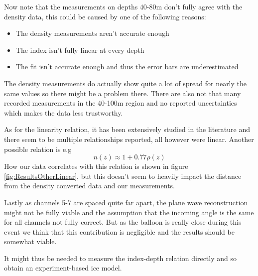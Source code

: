 Now note that the measurements on depths 40-80m don't fully agree with the density data, 
this could be caused by one of the following reasons:
\begin{itemize}
	\item The density measurements aren't accurate enough
	\item The index isn't fully linear at every depth
	\item The fit isn't accurate enough and thus the error bars are underestimated
\end{itemize}
The density measurements do actually show quite a lot of spread for
nearly the same values so there might be a problem there. There are
also not that many recorded measurements in the 40-100m region and no reported
uncertainties which makes the data less trustworthy.  

As for the linearity relation, it has been extensively studied in the literature
\cite{KOVACS1995245} and there seem to be multiple relationships reported,
all however were linear. Another possible relation is e.g
\begin{equation}
  n(z) \approx 1 + 0.77\rho(z)
\end{equation}
How our data correlates with this relation is shown in figure
\ref{fig:ResultsOtherLinear}, but this doesn't seem to heavily impact the
distance from the density converted data and our measurements.

Lastly as channels 5-7 are spaced quite far apart, the plane wave reconstruction
might not be fully viable and the assumption that the incoming angle is the same for
all channels not fully correct. But as the balloon is really close during this event
we think that this contribution is negligible and the results should be somewhat viable.

It might thus be needed to measure the index-depth relation directly and so
obtain an experiment-based ice model.
